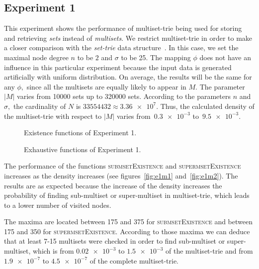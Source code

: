 \subsection{Experiment 1} \label{s:exp1}
This experiment shows the performance of multiset-trie being used for storing 
and retrieving \emph{sets} instead of \emph{multisets}. We restrict multiset-trie in order 
to make a closer comparison with the \emph{set-trie} data structure~\cite{savnik2013index}.
In this case, we set the maximal node degree $n$ to be $2$ and $\sigma$ to be 25. 
The mapping $\phi$ does not have an influence in this particular experiment
because the input data is generated artificially with uniform distribution. On 
average, the results will be the same for any $\phi,$ since all the multisets are 
equally likely to appear in $M.$ The parameter $|M|$ varies from 10000 sets up 
to 320000 sets. According to the parameters $n$ and $\sigma,$ the cardinality of 
$N$ is $33554432\approx \num{3.36e+7}.$ Thus, the calculated density of the 
multiset-trie with respect to $|M|$ varies from~$\num{0.3e-3}$ to~$\num{9.5e-3}.$


\begin{figure}
	\center
	\caption{Existence functions of Experiment 1.}
\end{figure}

\begin{figure}[ht]
\center
{}
\caption{Exhaustive functions of Experiment 1.}
\end{figure}

The performance of the functions \textsc{submsetExistence} and 
\textsc{supermsetExistence} increases as the density increases (see figures~\ref{fig:e1m1}
and~\ref{fig:e1m2}). The results are as expected because the increase of the 
density increases the probability of finding sub-multiset or super-multiset in 
multiset-trie, which leads to a lower number of visited nodes. 

The maxima are located between 175 and 375 for \textsc{submsetExistence} and 
between 175 and 350 for \textsc{supermsetExistence}. According to those maxima 
we can deduce that at least 7-15 multisets were checked in order to find 
sub-multiset or super-multiset, which is from $\num{0.02e-3}$ to $\num{1.5e-3}$ of the 
multiset-trie and from $\num{1.9e-7}$ to $\num{4.5e-7}$ of the complete 
multiset-trie.

